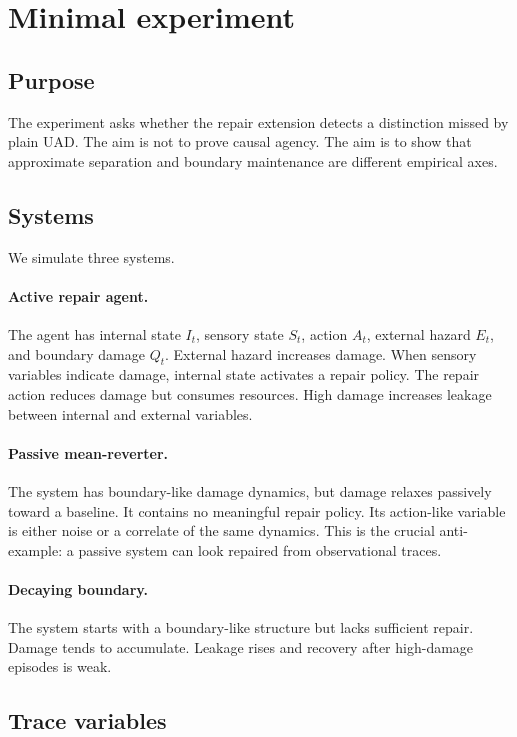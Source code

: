 \documentclass[11pt]{article}
\begin{document}
\section{Minimal experiment}

\subsection{Purpose}

The experiment asks whether the repair extension detects a distinction missed by plain UAD. The aim is not to prove causal agency. The aim is to show that approximate separation and boundary maintenance are different empirical axes.

\subsection{Systems}

We simulate three systems.

\paragraph{Active repair agent.}
The agent has internal state $I_t$, sensory state $S_t$, action $A_t$, external hazard $E_t$, and boundary damage $Q_t$. External hazard increases damage. When sensory variables indicate damage, internal state activates a repair policy. The repair action reduces damage but consumes resources. High damage increases leakage between internal and external variables.

\paragraph{Passive mean-reverter.}
The system has boundary-like damage dynamics, but damage relaxes passively toward a baseline. It contains no meaningful repair policy. Its action-like variable is either noise or a correlate of the same dynamics. This is the crucial anti-example: a passive system can look repaired from observational traces.

\paragraph{Decaying boundary.}
The system starts with a boundary-like structure but lacks sufficient repair. Damage tends to accumulate. Leakage rises and recovery after high-damage episodes is weak.

\subsection{Trace variables}
\end{document}
